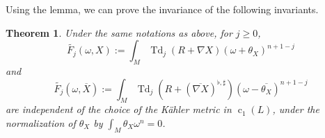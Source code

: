 \documentclass[12pt,reqno,a4paper]{amsart}
\numberwithin{equation}{section}
\DeclareMathOperator{\Td}{Td}
\DeclareMathOperator{\cc}{c}
\newtheorem{thm}{{\sc Theorem}}[section]
\theoremstyle{remark}
\theoremstyle{dotless}
\begin{document}
Using the lemma, we can prove the invariance of the following invariants.

\begin{thm}\label{futbar}
Under the same notations as above, for $j\geq 0$, 
\begin{equation}\label{FX}
\widetilde{F_j}(\omega,X):=\int_M \Td_j(R+\nabla X)(\omega+\theta_X)^{n+1-j} 
\end{equation}
and
\begin{equation}\label{FbarX}
\widetilde{F_j}(\omega,\overline{X}):=\int_M \Td_j(R+(\overline{\nabla X})^{\flat,\sharp})(\omega-\overline{\theta_X})^{n+1-j} 
\end{equation}
are independent of the choice of the K\"ahler metric in $\cc_1(L)$, under the normalization of $\theta_X$ by $\int_M \theta_X \omega^n =0$. 
\end{thm}
\end{document}

